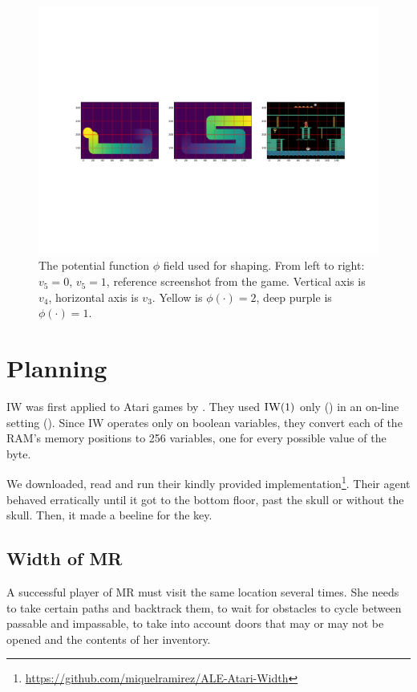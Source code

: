 {\begin{figure}[hbtp]
\begin{center}
\includegraphics[width=\textwidth]{img/shaping.pdf}
\end{center}
\caption[The potential function $\phi$ field used for shaping]{The potential
  function $\phi$ field used for shaping. From left to right: $v_5=0$, $v_5=1$,
  reference screenshot from the game. Vertical axis is $v_4$, horizontal axis
  is $v_3$. Yellow is $\phi(\cdot)=2$, deep purple is $\phi(\cdot)=1$.\label{fig:shaping}}
\end{figure}
}

\section{Planning}
\acl{IW} was first applied to Atari games by \citet{lipovetzky2015classical}.
They used $\textsc{IW}(1)$ only () in an on-line
setting (). Since \ac{IW} operates only on boolean
variables, they convert each of the \ac{RAM}'s memory positions to 256
variables, one for every possible value of the byte.

We downloaded, read and run their kindly provided
implementation\footnote{\href{https://github.com/miquelramirez/ALE-Atari-Width}{https://github.com/miquelramirez/ALE-Atari-Width}}.
Their agent behaved erratically until it got to the bottom floor, past the skull
or without the skull. Then, it made a beeline for the key.

\subsection{Width of \acl{MR}}
A successful player of \ac{MR} must visit the same location several times. She
needs to take certain paths and backtrack them, to wait for obstacles to cycle
between passable and impassable, to take into account doors that may or may not
be opened and the contents of her inventory.

